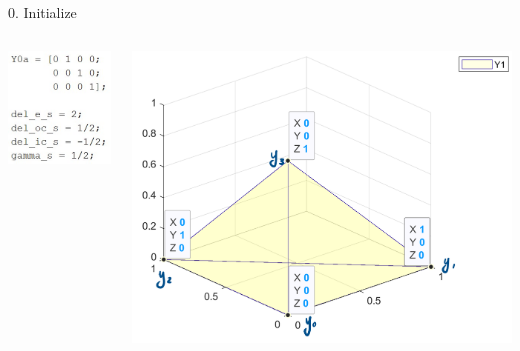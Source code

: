 \documentclass{beamer}
\begin{document}
\begin{frame}{0. Initialize}
	\begin{columns}
	\begin{column}{0.35\linewidth}
		\centering
		\includegraphics[width=0.75\linewidth]{Initialize}
	\end{column}
	\begin{column}{0.59\linewidth}
		\centering
		\includegraphics[width=0.95\linewidth]{InitializeFig}
	\end{column}
	\end{columns}
\end{frame}
\end{document}
